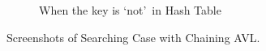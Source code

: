 \begin{itemize}
\begin{figure}[!ht]
\begin{subfigure}{0.45\textwidth}
			      \caption{When the key is `not'~in Hash Table}\label{fig:chainingavl-notfound-metric}
		      \end{subfigure}

		      \caption{Screenshots of Searching Case with Chaining AVL.}\label{fig:chainingavl-search-metric}
	      \end{figure}
\end{itemize}